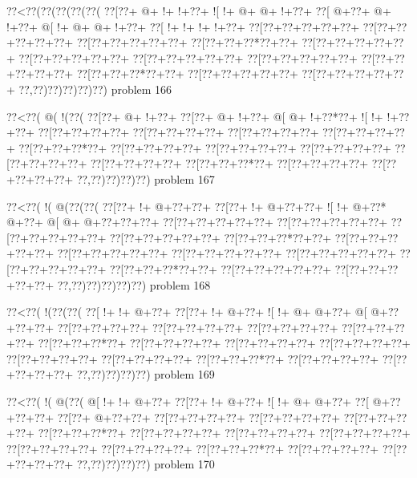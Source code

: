 \vbox{\vbox{\goo
\0??<\0??(\0??(\0??(\0??(\0??(
\0??[\0??+\- @+\- !+\- !+\0??+
\- ![\- !+\- @+\- @+\- !+\0??+
\0??[\- @+\0??+\- @+\- !+\0??+
\- @[\- !+\- @+\- @+\- !+\0??+
\0??[\- !+\- !+\- !+\- !+\0??+
\0??[\0??+\0??+\0??+\0??+\0??+
\0??[\0??+\0??+\0??+\0??+\0??+
\0??[\0??+\0??+\0??+\0??+\0??+
\0??[\0??+\0??+\0??*\0??+\0??+
\0??[\0??+\0??+\0??+\0??+\0??+
\0??[\0??+\0??+\0??+\0??+\0??+
\0??[\0??+\0??+\0??+\0??+\0??+
\0??[\0??+\0??+\0??+\0??+\0??+
\0??[\0??+\0??+\0??+\0??+\0??+
\0??[\0??+\0??+\0??*\0??+\0??+
\0??[\0??+\0??+\0??+\0??+\0??+
\0??[\0??+\0??+\0??+\0??+\0??+
\0??,\0??)\0??)\0??)\0??)\0??)
}
\hfil problem 166\hfil\break
}

\vbox{\vbox{\goo
\0??<\0??(\- @(\- !(\0??(
\0??[\0??+\- @+\- !+\0??+
\0??[\0??+\- @+\- !+\0??+
\- @[\- @+\- !+\0??*\0??+
\- ![\- !+\- !+\0??+\0??+
\0??[\0??+\0??+\0??+\0??+
\0??[\0??+\0??+\0??+\0??+
\0??[\0??+\0??+\0??+\0??+
\0??[\0??+\0??+\0??+\0??+
\0??[\0??+\0??+\0??*\0??+
\0??[\0??+\0??+\0??+\0??+
\0??[\0??+\0??+\0??+\0??+
\0??[\0??+\0??+\0??+\0??+
\0??[\0??+\0??+\0??+\0??+
\0??[\0??+\0??+\0??+\0??+
\0??[\0??+\0??+\0??*\0??+
\0??[\0??+\0??+\0??+\0??+
\0??[\0??+\0??+\0??+\0??+
\0??,\0??)\0??)\0??)\0??)
}
\hfil problem 167\hfil\break
}

\vbox{\vbox{\goo
\0??<\0??(\- !(\- @(\0??(\0??(
\0??[\0??+\- !+\- @+\0??+\0??+
\0??[\0??+\- !+\- @+\0??+\0??+
\- ![\- !+\- @+\0??*\- @+\0??+
\- @[\- @+\- @+\0??+\0??+\0??+
\0??[\0??+\0??+\0??+\0??+\0??+
\0??[\0??+\0??+\0??+\0??+\0??+
\0??[\0??+\0??+\0??+\0??+\0??+
\0??[\0??+\0??+\0??+\0??+\0??+
\0??[\0??+\0??+\0??*\0??+\0??+
\0??[\0??+\0??+\0??+\0??+\0??+
\0??[\0??+\0??+\0??+\0??+\0??+
\0??[\0??+\0??+\0??+\0??+\0??+
\0??[\0??+\0??+\0??+\0??+\0??+
\0??[\0??+\0??+\0??+\0??+\0??+
\0??[\0??+\0??+\0??*\0??+\0??+
\0??[\0??+\0??+\0??+\0??+\0??+
\0??[\0??+\0??+\0??+\0??+\0??+
\0??,\0??)\0??)\0??)\0??)\0??)
}
\hfil problem 168\hfil\break
}

\vbox{\vbox{\goo
\0??<\0??(\- !(\0??(\0??(
\0??[\- !+\- !+\- @+\0??+
\0??[\0??+\- !+\- @+\0??+
\- ![\- !+\- @+\- @+\0??+
\- @[\- @+\0??+\0??+\0??+
\0??[\0??+\0??+\0??+\0??+
\0??[\0??+\0??+\0??+\0??+
\0??[\0??+\0??+\0??+\0??+
\0??[\0??+\0??+\0??+\0??+
\0??[\0??+\0??+\0??*\0??+
\0??[\0??+\0??+\0??+\0??+
\0??[\0??+\0??+\0??+\0??+
\0??[\0??+\0??+\0??+\0??+
\0??[\0??+\0??+\0??+\0??+
\0??[\0??+\0??+\0??+\0??+
\0??[\0??+\0??+\0??*\0??+
\0??[\0??+\0??+\0??+\0??+
\0??[\0??+\0??+\0??+\0??+
\0??,\0??)\0??)\0??)\0??)
}
\hfil problem 169\hfil\break
}

\vbox{\vbox{\goo
\0??<\0??(\- !(\- @(\0??(
\- @[\- !+\- !+\- @+\0??+
\0??[\0??+\- !+\- @+\0??+
\- ![\- !+\- @+\- @+\0??+
\0??[\- @+\0??+\0??+\0??+
\0??[\0??+\- @+\0??+\0??+
\0??[\0??+\0??+\0??+\0??+
\0??[\0??+\0??+\0??+\0??+
\0??[\0??+\0??+\0??+\0??+
\0??[\0??+\0??+\0??*\0??+
\0??[\0??+\0??+\0??+\0??+
\0??[\0??+\0??+\0??+\0??+
\0??[\0??+\0??+\0??+\0??+
\0??[\0??+\0??+\0??+\0??+
\0??[\0??+\0??+\0??+\0??+
\0??[\0??+\0??+\0??*\0??+
\0??[\0??+\0??+\0??+\0??+
\0??[\0??+\0??+\0??+\0??+
\0??,\0??)\0??)\0??)\0??)
}
\hfil problem 170\hfil\break
}

